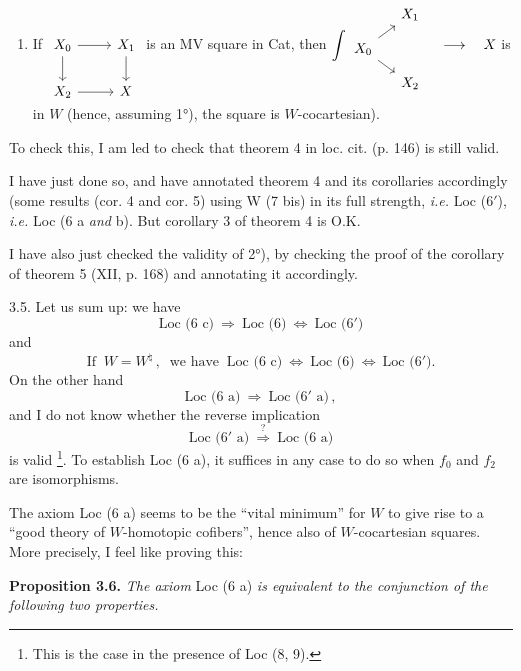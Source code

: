\documentclass[11pt]{article}
\newcommand{\printedpage}[1]{\marginpar{\footnotesize p.~#1}}
\newcommand{\msp}[1]{\marginpar{\footnotesize [#1]}}
\begin{document}
\begin{enumerate}
\item[1° bis)] If
$\begin{tikzcd}[ampersand replacement=\&, baseline=(\tikzcdmatrixname-1-1.base)]
X_0 \arrow[r] \arrow[d] \& X_1 \arrow[d] \\
X_2 \arrow[r] \& X
\end{tikzcd}$
is an MV square in Cat, then
$\displaystyle\int
\begin{tikzcd}[ampersand replacement=\&, row sep=small, column sep=small]
\& X_1 \\
X_0 \arrow[ur] \arrow[dr] \& \\
\& X_2
\end{tikzcd}
\quad \longrightarrow \quad X$ is in $W$ (hence, assuming 1°), the square is $W$-cocartesian).
\end{enumerate}

\printedpage{17}
To check this, I am led to check that theorem 4 in loc. cit. (p. 146) is still valid.

I have just done so, and have annotated theorem 4 and its corollaries accordingly (some results (cor. 4 and cor. 5) using W (7 bis) in its full strength, \textit{i.e.} Loc (6$'$), \textit{i.e.} Loc (6 a \textit{and} b). But corollary 3 of theorem 4 is O.K.

I have also just checked the validity of 2°), by checking the proof of the corollary of theorem 5 (XII, p. 168) and annotating it accordingly.

\msp{page 25}3.5. Let us sum up: we have
\[
\text{Loc (6 c)} \ \Longrightarrow \ \text{Loc (6)} \ \iff \ \text{Loc (6$'$)}
\tag*{(3.5.1)}
\]
and
\[
\text{If } \ W = W^{\natural}\,, \ \text{ we have } \ \text{Loc (6 c)} \ \iff \ \text{Loc (6)} \ \iff \ \text{Loc (6$'$)}.
\tag*{(3.5.2)}
\]
On the other hand
\[
\text{Loc (6 a)} \ \Longrightarrow \ \text{Loc (6$'$ a)}\,,
\tag*{(3.5.3)}
\]
and I do not know whether the reverse implication
\[
\text{Loc (6$'$ a)} \ \overset{?}{\Longrightarrow} \ \text{Loc (6 a)}
\]
is valid \footnote[18]{This is the case in the presence of Loc (8, 9).}. To establish Loc (6 a), it suffices in any case to do so when $f_0$ and $f_2$ are isomorphisms.

The axiom Loc (6 a) seems to be the ``vital minimum'' for $W$ to give rise to a ``good theory of $W$-homotopic cofibers'', hence also of $W$-cocartesian squares. More precisely, I feel like proving this:

\textbf{Proposition 3.6.} \textit{The axiom} Loc (6 a) \textit{is equivalent to the conjunction of the following two properties.}
\end{document}
